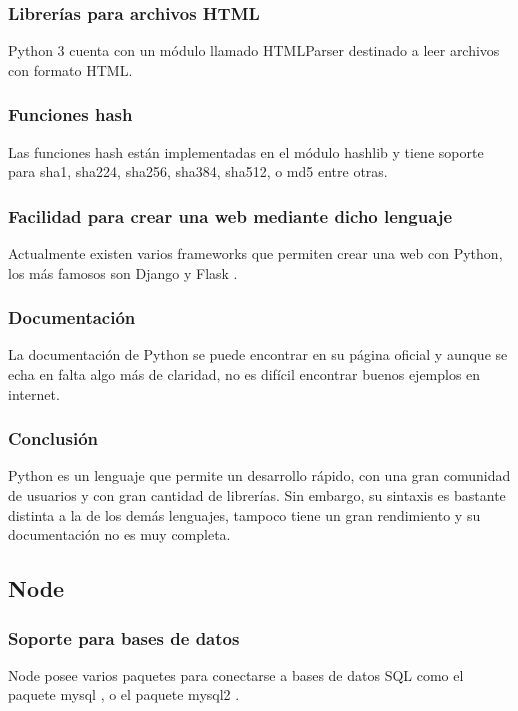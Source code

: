 \subsubsection{Librerías para archivos HTML}
Python 3 cuenta con un módulo llamado HTMLParser \cite{python_HTMLParser} destinado a leer archivos con formato HTML. 

\subsubsection{Funciones hash}
Las funciones hash están implementadas en el módulo hashlib \cite{python_hashlib} y tiene soporte para sha1, sha224, sha256, sha384, sha512, o md5 entre otras. 

\subsubsection{Facilidad para crear una web mediante dicho lenguaje}
Actualmente existen varios frameworks que permiten crear una web con Python, los más famosos son Django \cite{python_Django} y Flask \cite{python_Flask}.

\subsubsection{Documentación}
La documentación de Python se puede encontrar en su página oficial \cite{python_docu} y aunque se echa en falta algo más de claridad, no es difícil encontrar buenos ejemplos en internet. 

\subsubsection{Conclusión}
Python es un lenguaje que permite un desarrollo rápido, con una gran comunidad de usuarios y con gran cantidad de librerías. 
Sin embargo, su sintaxis es bastante distinta a la de los demás lenguajes, tampoco tiene un gran rendimiento y su documentación no es muy completa.

\subsection{Node}
\subsubsection{Soporte para bases de datos}
Node posee varios paquetes para conectarse a bases de datos SQL como el paquete mysql \cite{node_mysql}, o el paquete mysql2 \cite{node_mysql2}.

